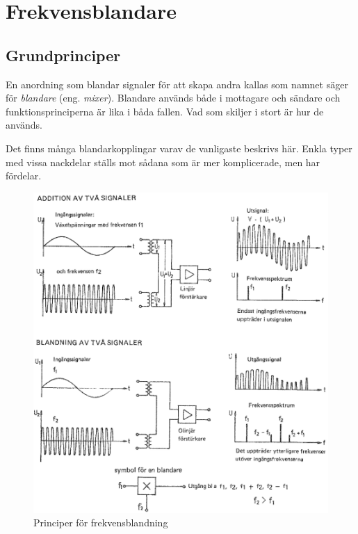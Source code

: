 \section{Frekvensblandare}
\label{blandare}

\subsection{Grundprinciper}

En anordning som blandar signaler för att skapa andra kallas som namnet säger
för \emph{blandare} (eng. \emph{mixer}).
Blandare används både i mottagare och sändare och funktionsprinciperna är lika
i båda fallen.
Vad som skiljer i stort är hur de används.

Det finns många blandarkopplingar varav de vanligaste beskrivs här.
Enkla typer med vissa nackdelar ställs mot sådana som är mer
komplicerade, men har fördelar.

\begin{figure}
\includegraphics[width=\textwidth]{images/cropped_pdfs/bild_2_3-83.pdf}
\caption{Principer för frekvensblandning}
\label{fig:BildII3-83}
\end{figure}

